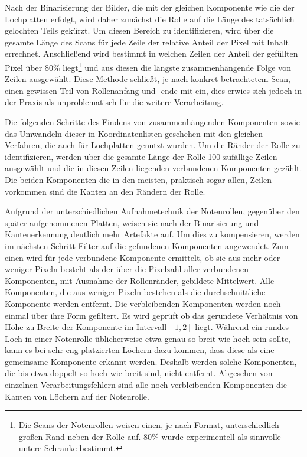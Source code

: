 Nach der Binarisierung der Bilder, die mit der gleichen Komponente wie die der Lochplatten erfolgt, wird daher zunächst die Rolle auf die Länge des tatsächlich gelochten Teils gekürzt.
Um diesen Bereich zu identifizieren, wird über die gesamte Länge des Scans für jede Zeile der relative Anteil der Pixel mit Inhalt errechnet.
Anschließend wird bestimmt in welchen Zeilen der Anteil der gefüllten Pixel über 80\% liegt\footnote{Die Scans der Notenrollen weisen einen, je nach Format, unterschiedlich großen Rand neben der Rolle auf. 80\% wurde experimentell als sinnvolle untere Schranke bestimmt.} und aus diesen die längste zusammenhängende Folge von Zeilen ausgewählt.
Diese Methode schließt, je nach konkret betrachtetem Scan, einen gewissen Teil von Rollenanfang und -ende mit ein, dies erwies sich jedoch in der Praxis als unproblematisch für die weitere Verarbeitung.

Die folgenden Schritte des Findens von zusammenhängenden Komponenten sowie das Umwandeln dieser in Koordinatenlisten geschehen mit den gleichen Verfahren, die auch für Lochplatten genutzt wurden.
Um die Ränder der Rolle zu identifizieren, werden über die gesamte Länge der Rolle 100 zufällige Zeilen ausgewählt und die in diesen Zeilen liegenden verbundenen Komponenten gezählt.
Die beiden Komponenten die in den meisten, praktisch sogar allen, Zeilen vorkommen sind die Kanten an den Rändern der Rolle.

Aufgrund der unterschiedlichen Aufnahmetechnik der Notenrollen, gegenüber den später aufgenommenen Platten, weisen sie nach der Binarisierung und Kantenerkennung deutlich mehr Artefakte auf.
Um dies zu kompensieren, werden im nächsten Schritt Filter auf die gefundenen Komponenten angewendet.
Zum einen wird für jede verbundene Komponente ermittelt, ob sie aus mehr oder weniger Pixeln besteht als der über die Pixelzahl aller verbundenen Komponenten, mit Ausnahme der Rollenränder, gebildete Mittelwert.
Alle Komponenten, die aus weniger Pixeln bestehen als die durchschnittliche Komponente werden entfernt.
Die verbleibenden Komponenten werden noch einmal über ihre Form gefiltert.
Es wird geprüft ob das gerundete Verhältnis von Höhe zu Breite der Komponente im Intervall $[1,2]$ liegt.
Während ein rundes Loch in einer Notenrolle üblicherweise etwa genau so breit wie hoch sein sollte, kann es bei sehr eng platzierten Löchern dazu kommen, dass diese als eine gemeinsame Komponente erkannt werden.
Deshalb werden solche Komponenten, die bis etwa doppelt so hoch wie breit sind, nicht entfernt.
Abgesehen von einzelnen Verarbeitungsfehlern sind alle noch verbleibenden Komponenten die Kanten von Löchern auf der Notenrolle.

